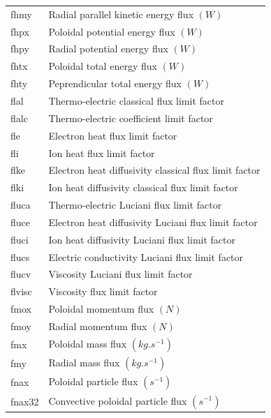 \documentclass[a4paper,10pt]{report}
\begin{document}
\begin{center}
\begin{longtable}{|l|l|}
    fhmy     & \index{b2plot, fhmy} Radial parallel kinetic energy flux $(W)$ \\
    fhpx     & \index{b2plot, fhpx} Poloidal potential energy flux $(W)$ \\
    fhpy     & \index{b2plot, fhpy} Radial potential energy flux $(W)$ \\
    fhtx     & \index{b2plot, fhtx} Poloidal total energy flux $(W)$ \\
    fhty     & \index{b2plot, fhty} Peprendicular total energy flux $(W)$ \\
    flal     & \index{b2plot, flal} Thermo-electric classical flux limit factor \\
    flalc    & \index{b2plot, flalc} Thermo-electric coefficient limit factor \\
    fle      & \index{b2plot, fle} Electron heat flux limit factor \\
    fli      & \index{b2plot, fli} Ion heat flux limit factor \\
    flke     & \index{b2plot, flke} Electron heat diffusivity classical flux limit factor \\
    flki     & \index{b2plot, flki} Ion heat diffusivity classical flux limit factor \\
    fluca    & \index{b2plot, fluca} Thermo-electric Luciani flux limit factor \\
    fluce    & \index{b2plot, fluce} Electron heat diffusivity Luciani flux limit factor \\
    fluci    & \index{b2plot, fluci} Ion heat diffusivity Luciani flux limit factor \\
    flucs    & \index{b2plot, flucs} Electric conductivity Luciani flux limit factor \\
    flucv    & \index{b2plot, flucv} Viscosity Luciani flux limit factor \\
    flvisc   & \index{b2plot, flvisc} Viscosity flux limit factor \\
    fmox     & \index{b2plot, fmox} Poloidal momentum flux $(N)$ \\
    fmoy     & \index{b2plot, fmoy} Radial momentum flux $(N)$ \\
    fmx      & \index{b2plot, fmx} Poloidal mass flux $(kg.s^{-1})$ \\
    fmy      & \index{b2plot, fmy} Radial mass flux $(kg.s^{-1})$ \\
    fnax     & \index{b2plot, fnax} Poloidal particle flux $(s^{-1})$ \\
    fnax32   & \index{b2plot, fnax32} Convective poloidal particle flux $(s^{-1})$ \\

\end{longtable}
\end{center}
\end{document}
